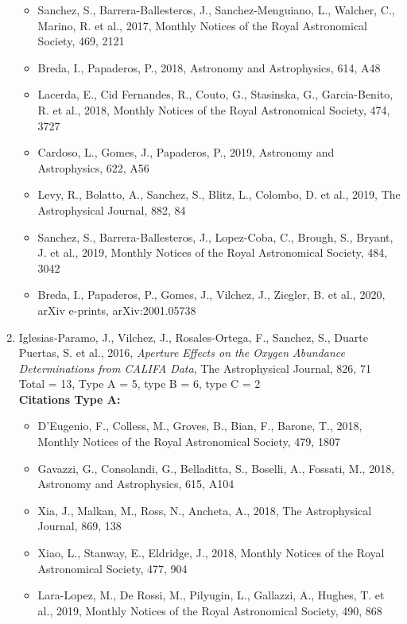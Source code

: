 \documentclass{letter}
\begin{document}
\begin{enumerate}
\begin{itemize}
\item Sanchez, S., Barrera-Ballesteros, J., Sanchez-Menguiano, L., Walcher, C., Marino, R. et al., 2017, Monthly Notices of the Royal Astronomical Society, 469, 2121
\item Breda, I., Papaderos, P., 2018, Astronomy and Astrophysics, 614, A48
\item Lacerda, E., Cid Fernandes, R., Couto, G., Stasinska, G., Garcia-Benito, R. et al., 2018, Monthly Notices of the Royal Astronomical Society, 474, 3727
\item Cardoso, L., Gomes, J., Papaderos, P., 2019, Astronomy and Astrophysics, 622, A56
\item Levy, R., Bolatto, A., Sanchez, S., Blitz, L., Colombo, D. et al., 2019, The Astrophysical Journal, 882, 84
\item Sanchez, S., Barrera-Ballesteros, J., Lopez-Coba, C., Brough, S., Bryant, J. et al., 2019, Monthly Notices of the Royal Astronomical Society, 484, 3042
\item Breda, I., Papaderos, P., Gomes, J., Vilchez, J., Ziegler, B. et al., 2020, arXiv e-prints, arXiv:2001.05738
\end{itemize}
\item Iglesias-Paramo, J., Vilchez, J., Rosales-Ortega, F., Sanchez, S., Duarte Puertas, S. et al., 2016, {\it Aperture Effects on the Oxygen Abundance Determinations from CALIFA Data}, The Astrophysical Journal, 826, 71 \\ 
Total = 13, Type A = 5, type B = 6, type C = 2 \\ 
{\bf Citations Type A:}
\begin{itemize}
\item D'Eugenio, F., Colless, M., Groves, B., Bian, F., Barone, T., 2018, Monthly Notices of the Royal Astronomical Society, 479, 1807
\item Gavazzi, G., Consolandi, G., Belladitta, S., Boselli, A., Fossati, M., 2018, Astronomy and Astrophysics, 615, A104
\item Xia, J., Malkan, M., Ross, N., Ancheta, A., 2018, The Astrophysical Journal, 869, 138
\item Xiao, L., Stanway, E., Eldridge, J., 2018, Monthly Notices of the Royal Astronomical Society, 477, 904
\item Lara-Lopez, M., De Rossi, M., Pilyugin, L., Gallazzi, A., Hughes, T. et al., 2019, Monthly Notices of the Royal Astronomical Society, 490, 868
\end{itemize}

\end{enumerate}
\end{document}

